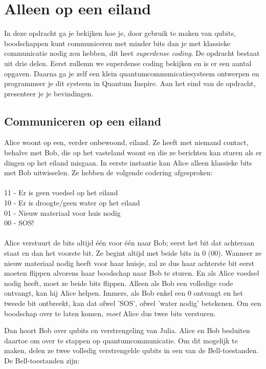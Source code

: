 \documentclass[10pt, a4paper]{article}
\begin{document}



\clearpage
\section*{Alleen op een eiland}
In deze opdracht ga je bekijken hoe je, door gebruik te maken van qubits, boodschappen kunt communiceren met minder bits dan je met klassieke communicatie nodig zou hebben, dit heet \emph{superdense coding}. De opdracht bestaat uit drie delen. Eerst zullemn we superdense coding bekijken en is er een aantal opgaven. Daarna ga je zelf een klein quantumcommunicatiesysteem ontwerpen en programmeer je dit systeem in Quantum Inspire. Aan het eind van de opdracht, presenteer je je bevindingen.

\subsection*{Communiceren op een eiland}
Alice woont op een, verder onbewoond, eiland. Ze heeft met niemand contact, behalve met Bob, die op het vasteland woont en die ze berichten kan sturen als er dingen op het eiland misgaan. In eerste instantie kan Alice alleen klassieke bits met Bob uitwisselen. Ze hebben de volgende codering afgesproken:\\
\\
11 - Er is geen voedsel op het eiland\\
10 - Er is droogte/geen water op het eiland\\
01 - Nieuw materiaal voor huis nodig\\
00 - SOS!\\
\\
Alice verstuurt de bits altijd \'{e}\'{e}n voor \'{e}\'{e}n naar Bob; eerst het bit dat achteraan staat en dan het voorste bit. Ze begint altijd met beide bits in 0 (00). Wanneer ze nieuw materiaal nodig heeft voor haar huisje, zal ze dus haar achterste bit eerst moeten flippen alvorens haar boodschap naar Bob te sturen. En als Alice voedsel nodig heeft, moet ze beide bits flippen. Alleen als Bob een volledige code ontvangt, kan hij Alice helpen. Immers, als Bob enkel een 0 ontvangt en het tweede bit ontbreekt, kan dat ofwel 'SOS', ofwel 'water nodig' betekenen. Om een boodschap over te laten komen, \emph{moet} Alice dus twee bits versturen.

Dan hoort Bob over qubits en verstrengeling van Julia. Alice en Bob besluiten daartoe om over te stappen op quantumcommunicatie. Om dit mogelijk te maken, delen ze twee volledig verstrengelde qubits in een van de Bell-toestanden. De Bell-toestanden zijn:
\end{document}
